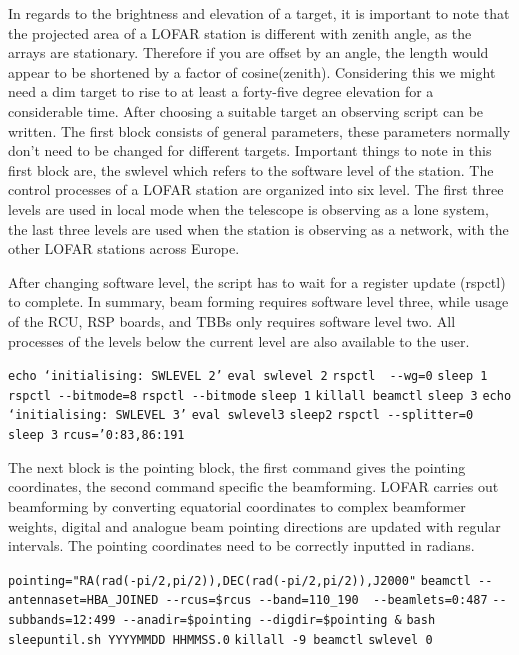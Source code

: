 \documentclass[11pt,fleqn]{book} %
\begin{document}
In regards to the brightness and elevation of a target, it is important to note that the projected area of a LOFAR station is different with zenith angle, as the arrays are stationary. Therefore if you are offset by an angle, the length would appear to be shortened by a factor of cosine(zenith). Considering this we might need a dim target to rise to at least a forty-five degree elevation for a considerable time. After choosing a suitable target an observing script can be written. The first block consists of general parameters, these parameters normally don’t need to be changed for different targets. Important things to note in this first block are, the swlevel which refers to the software level of the station. The control processes of a LOFAR station are organized into six level. The first three levels are used in local mode when the telescope is observing as a lone system, the last three levels are used when the station is observing as a network, with the other LOFAR stations across Europe.

After changing software level, the script has to wait for a register update (rspctl) to complete. In summary, beam forming requires software level three, while usage of the RCU, RSP boards, and TBBs only requires software level two. All processes of the levels below the current level are also available to the user.


\vspace{7mm}

\verb|echo ‘initialising: SWLEVEL 2’|
\bigbreak{}
\verb|eval swlevel 2|
\bigbreak{}
\verb|rspctl  --wg=0|
\bigbreak{}
\verb|sleep 1|
\bigbreak{}
\verb|rspctl --bitmode=8|
\bigbreak{}
\verb|rspctl --bitmode|
\bigbreak{}
\verb|sleep 1|
\bigbreak{}
\verb|killall beamctl|
\bigbreak{}
\verb|sleep 3|
\bigbreak{}
\verb|echo ‘initialising: SWLEVEL 3’|
\bigbreak{}
\verb|eval swlevel3|
\bigbreak{}
\verb|sleep2|
\bigbreak{}
\verb|rspctl --splitter=0|
\bigbreak{}
\verb|sleep 3|
\bigbreak{}
\verb|rcus=’0:83,86:191|

\vspace{7mm}

The next block is the pointing block, the first command gives the pointing coordinates, the second command specific the beamforming. LOFAR carries out beamforming by converting equatorial coordinates to complex beamformer weights, digital and analogue beam pointing directions are updated with regular intervals. The pointing coordinates need to be correctly inputted in radians. 


\vspace{7mm}
\verb|pointing="RA(rad(-pi/2,pi/2)),DEC(rad(-pi/2,pi/2)),J2000"|
\bigbreak{}
\verb|beamctl --antennaset=HBA_JOINED --rcus=$rcus --band=110_190  --beamlets=0:487|
\bigbreak{}
\verb|--subbands=12:499 --anadir=$pointing --digdir=$pointing &|
\bigbreak{}
\verb|bash sleepuntil.sh YYYYMMDD HHMMSS.0|
\bigbreak{}
\verb|killall -9 beamctl|
\bigbreak{}
\verb|swlevel 0|
\end{document}
